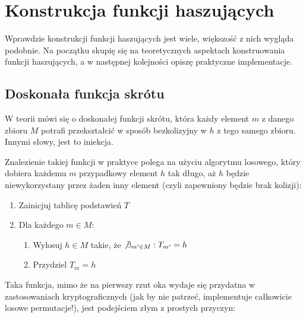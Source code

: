 \documentclass[12pt,a4paper,twoside]{article}
\begin{document}
\section{Konstrukcja funkcji haszujących}
\label{sec:hash_construction}
Wprawdzie konstrukcji funkcji haszujących jest wiele, większość z nich wygląda
podobnie. Na początku skupię się na teoretycznych aspektach konstruowania
funkcji haszujących, a w następnej kolejności opiszę praktyczne implementacje.

\subsection{Doskonała funkcja skrótu}
W teorii mówi się o doskonałej funkcji skrótu, która każdy element $m$ z danego
zbioru $M$ potrafi przekształcić w sposób bezkolizyjny w $h$ z tego samego
zbioru. Innymi słowy, jest to iniekcja.

Znalezienie takiej funkcji w praktyce polega na użyciu algorytmu losowego,
który dobiera każdemu $m$ przypadkowy element $h$ tak długo, aż $h$ będzie
niewykorzystany przez żaden inny element (czyli zapewniony będzie brak
kolizji):

\begin{enumerate}
\item Zainicjuj tablicę podstawień $T$
\item Dla każdego $m \in M$:
    \begin{enumerate}[label*=\arabic*.]
        \item Wylosuj $h \in M$ takie, że $\not \exists_{m' \in M} : T_{m'} = h$
        \item Przydziel $T_m = h$
    \end{enumerate}
\end{enumerate}

Taka funkcja, mimo że na pierwszy rzut oka wydaje się przydatna w
zastosowaniach kryptograficznych (jak by nie patrzeć, implementuje całkowicie
losowe permutacje!), jest podejściem złym z prostych przyczyn:
\end{document}
